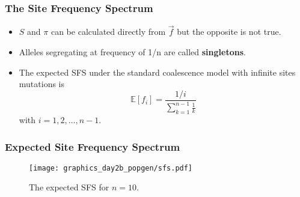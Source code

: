 \documentclass{beamer}
\newcommand{\E}{\mathbb{E}}
\newcommand{\1}{\ensuremath{\mathbf{1}}}
\begin{document}
%
%
%
\begin{frame}\frametitle{The Site Frequency Spectrum}
	\begin{itemize}
		\item $S$ and $\pi$ can be calculated directly from $\vec{f}$ but the opposite is not true.
		\item Alleles segregating at frequency of 1/n are called \textbf{singletons}.
		\item The expected SFS under the standard coalescence model with
infinite sites mutations is
			\begin{equation}
				\E[f_i] = \frac{1/i}{\sum_{k=1}^{n-1}\tfrac{1}{k}}
			\end{equation}
			with $i = 1,2,\ldots,n-1$.
	\end{itemize}
\end{frame}
%
%
%
\begin{frame}\frametitle{Expected Site Frequency Spectrum}
	\begin{figure}
	\begin{center}
		\texttt{[image: graphics\_day2b\_popgen/sfs.pdf]}
	\end{center}
	\caption{The expected SFS for $n=10$.}
	\end{figure}
\end{frame}
%
%
%
\end{document}
